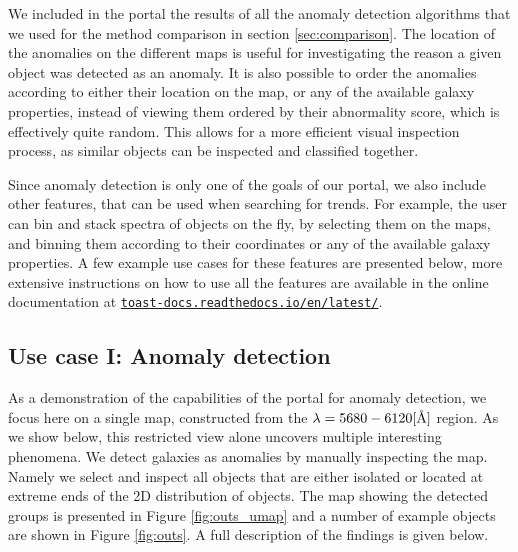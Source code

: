 \documentclass[fleqn,usenatbib]{mnras}
\newcommand{\angstrom}{\mbox{\normalfont\AA}}
\newcommand{\manu}{\href{https://toast-docs.readthedocs.io/en/latest/}{\texttt{toast-docs.readthedocs.io/en/latest/}}}
\begin{document}
{We included in the portal the results of all the anomaly detection algorithms that we used for the method comparison in section \ref{sec:comparison}. The location of the anomalies on the different maps is useful for investigating the reason a given object was detected as an anomaly.  It is also possible to order the anomalies according to either  their location on the map, or  any of the available galaxy properties, instead of viewing them ordered by their abnormality score, which is effectively quite random. This allows for a more efficient visual inspection process, as similar objects can be inspected and classified together. 


Since anomaly detection is only one of the goals of our portal, we also include other features, that can be used when searching for trends. For example, the user can bin and stack spectra of objects on the fly, by selecting them on the maps, and  binning them according to their coordinates  or  any of the available galaxy properties. A few example use cases for these features are presented below, more extensive instructions on how to use all the features are available in the online documentation at \manu{}.



\subsection{Use case I: Anomaly detection}

\label{sec:nad_anomalies}

As a demonstration of the capabilities of the portal for anomaly detection, we focus here on a single map, constructed from the $\lambda = 5680 - 6120 [\angstrom]$ region. As we show below, this restricted view alone uncovers multiple interesting phenomena. 
 We detect galaxies as anomalies by manually inspecting the map. Namely we  select and inspect all objects that are either isolated or located at extreme ends of the 2D distribution of objects. The map showing the detected groups is presented in Figure \ref{fig:outs_umap} and a number of example objects are shown in Figure \ref{fig:outs}. A full description of the findings is given below.

\begin{figure}


\end{figure}}
\end{document}
